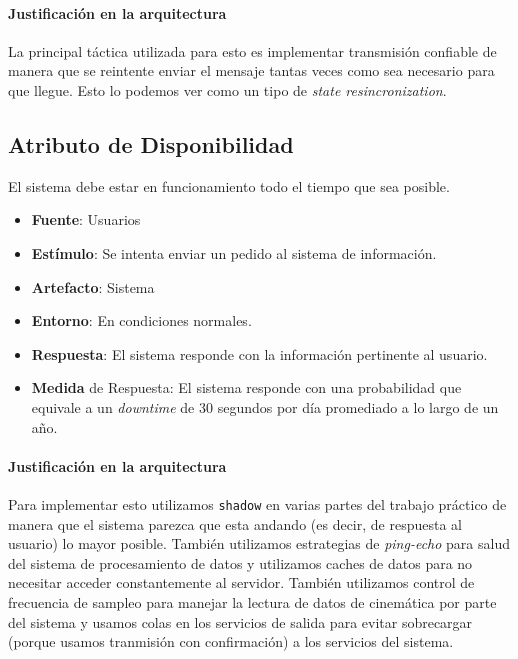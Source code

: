 \paragraph{Justificación en la arquitectura}

La principal táctica utilizada para esto es implementar transmisión confiable de manera que se reintente enviar
el mensaje tantas veces como sea necesario para que llegue. Esto lo podemos ver como un tipo de \textit{state
resincronization}. 

\subsection{Atributo de Disponibilidad}
El sistema debe estar en funcionamiento todo el tiempo que sea posible.

\begin{itemize}
  \item \textbf{Fuente}: Usuarios
  \item \textbf{Estímulo}: Se intenta enviar un pedido al sistema de información.
  \item \textbf{Artefacto}: Sistema
  \item \textbf{Entorno}: En condiciones normales.
  \item \textbf{Respuesta}: El sistema responde con la información pertinente al usuario.
  \item \textbf{Medida} de Respuesta: El sistema responde con una probabilidad que equivale a un \emph{downtime} de 30 segundos por día promediado a lo largo de un año.
\end{itemize}

\paragraph{Justificación en la arquitectura}

Para implementar esto utilizamos \texttt{shadow} en varias partes del trabajo práctico de manera que el sistema
parezca que esta andando (es decir, de respuesta al usuario) lo mayor posible. También utilizamos estrategias
de \textit{ping-echo} para salud del sistema de procesamiento de datos y utilizamos caches de datos para no 
necesitar acceder constantemente al servidor. También utilizamos control de frecuencia de sampleo para manejar
la lectura de datos de cinemática por parte del sistema y usamos colas en los servicios de salida para evitar
sobrecargar (porque usamos tranmisión con confirmación) a los servicios del sistema.


